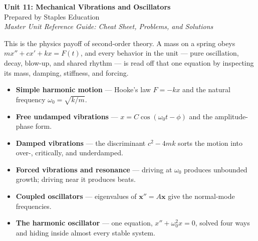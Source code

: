 




\begin{center}
    {\LARGE \bfseries Unit 11: Mechanical Vibrations and Oscillators}\\[6pt]
    {\large Prepared by Staples Education}\\[4pt]
    {\itshape Master Unit Reference Guide: Cheat Sheet, Problems, and Solutions}
\end{center}

\vspace{0.4em}

\tableofcontents

\vspace{0.4em}

\begin{topicsbox}
This is the physics payoff of second-order theory. A mass on a spring obeys
$m x'' + c x' + k x = F(t)$, and every behavior in the unit --- pure oscillation,
decay, blow-up, and shared rhythm --- is read off that one equation by inspecting
its mass, damping, stiffness, and forcing.
\begin{itemize}[leftmargin=1.4em, itemsep=3pt]
    \item \textbf{Simple harmonic motion} --- Hooke's law $F=-kx$ and the natural
          frequency $\omega_0=\sqrt{k/m}$.
    \item \textbf{Free undamped vibrations} --- $x = C\cos(\omega_0 t - \phi)$ and the
          amplitude-phase form.
    \item \textbf{Damped vibrations} --- the discriminant $c^2-4mk$ sorts the motion
          into over-, critically, and underdamped.
    \item \textbf{Forced vibrations and resonance} --- driving at $\omega_0$ produces
          unbounded growth; driving near it produces beats.
    \item \textbf{Coupled oscillators} --- eigenvalues of $\mathbf{x}''=A\mathbf{x}$
          give the normal-mode frequencies.
    \item \textbf{The harmonic oscillator} --- one equation, $x''+\omega_0^2 x=0$,
          solved four ways and hiding inside almost every stable system.
\end{itemize}
\end{topicsbox}

